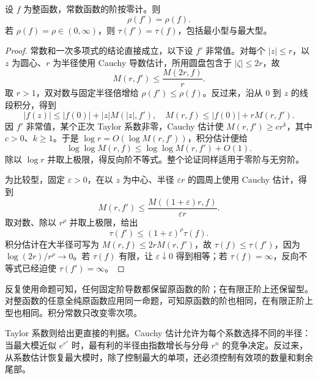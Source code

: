 \begin{proposition}[导数的阶与型]\label{b3:prop:19-derivative-order}
设 \(f\) 为整函数，常数函数的阶按零计。则
\[
 \rho(f')=\rho(f).
\]
若 \(\rho(f)=\rho\in(0,\infty)\)，则 \(\tau(f')=\tau(f)\)，包括最小型与最大型。
\end{proposition}
\begin{proof}
常数和一次多项式的结论直接成立，以下设 \(f'\) 非常值。对每个 \(|z|\le r\)，以 \(z\) 为圆心、\(r\) 为半径使用 Cauchy 导数估计，所用圆盘包含于 \(|\zeta|\le2r\)，故
\[
 M(r,f')\le\frac{M(2r,f)}r.
\]
取 \(r>1\)，双对数与固定半径倍增给 \(\rho(f')\le\rho(f)\)。反过来，沿从 \(0\) 到 \(z\) 的线段积分，得到
\[
 |f(z)|\le|f(0)|+|z|M(|z|,f'),
 \quad
 M(r,f)\le|f(0)|+rM(r,f').
\]
因 \(f'\) 非常值，某个正次 Taylor 系数非零，Cauchy 估计使 \(M(r,f')\ge c r^k\)，其中 \(c>0\)、\(k\ge1\)。于是 \(\log r=O(\log M(r,f'))\)，积分估计便给
\[
 \log\log M(r,f)\le\log\log M(r,f')+O(1).
\]
除以 \(\log r\) 并取上极限，得反向阶不等式。整个论证同样适用于零阶与无穷阶。

为比较型，固定 \(\varepsilon>0\)，在以 \(z\) 为中心、半径 \(\varepsilon r\) 的圆周上使用 Cauchy 估计，得到
\[
 M(r,f')\le\frac{M((1+\varepsilon)r,f)}{\varepsilon r}.
\]
取对数、除以 \(r^\rho\) 并取上极限，给出
\[
 \tau(f')\le(1+\varepsilon)^\rho\tau(f).
\]
积分估计在大半径可写为 \(M(r,f)\le2rM(r,f')\)，故 \(\tau(f)\le\tau(f')\)，因为 \(\log(2r)/r^\rho\to0\)。若 \(\tau(f)\) 有限，让 \(\varepsilon\downarrow0\) 得到相等；若 \(\tau(f)=\infty\)，反向不等式已经迫使 \(\tau(f')=\infty\)。
\end{proof}
反复使用命题可知，任何固定阶导数都保留原函数的阶；在有限正阶上还保留型。对整函数的任意全纯原函数应用同一命题，可知原函数的阶也相同，在有限正阶上型也相同。积分常数只改变零次项。

\ProseParagraphBreak

Taylor 系数则给出更直接的判据。Cauchy 估计允许为每个系数选择不同的半径：当最大模近似 \(e^{r^s}\) 时，最有利的半径由指数增长与分母 \(r^n\) 的竞争决定。反过来，从系数估计恢复最大模时，除了控制最大的单项，还必须控制有效项的数量和剩余尾部。

